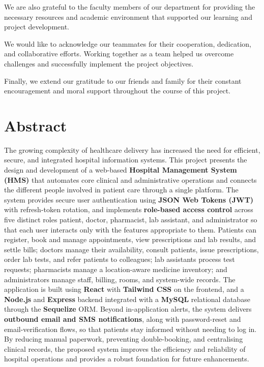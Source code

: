 \documentclass[12pt,a4paper]{report}
\begin{document}
We are also grateful to the faculty members of our department for providing the
necessary resources and academic environment that supported our learning and
project development.

We would like to acknowledge our teammates for their cooperation, dedication, and
collaborative efforts. Working together as a team helped us overcome challenges and
successfully implement the project objectives.

Finally, we extend our gratitude to our friends and family for their constant
encouragement and moral support throughout the course of this project.

\chapter*{Abstract}
The growing complexity of healthcare delivery has increased the need for efficient,
secure, and integrated hospital information systems. This project presents the design
and development of a web-based \textbf{Hospital Management System (HMS)} that
automates core clinical and administrative operations and connects the different
people involved in patient care through a single platform. The system provides secure
user authentication using \textbf{JSON Web Tokens (JWT)} with refresh-token rotation,
and implements \textbf{role-based access control} across five distinct roles patient,
doctor, pharmacist, lab assistant, and administrator so that each user interacts only
with the features appropriate to them. Patients can register, book and manage
appointments, view prescriptions and lab results, and settle bills; doctors manage
their availability, consult patients, issue prescriptions, order lab tests, and refer
patients to colleagues; lab assistants process test requests; pharmacists manage a
location-aware medicine inventory; and administrators manage staff, billing, rooms,
and system-wide records. The application is built using \textbf{React} with
\textbf{Tailwind CSS} on the frontend, and a \textbf{Node.js} and \textbf{Express}
backend integrated with a \textbf{MySQL} relational database through the
\textbf{Sequelize} ORM. Beyond in-application alerts, the system delivers
\textbf{outbound email and SMS notifications}, along with password-reset and
email-verification flows, so that patients stay informed without needing to log in. By
reducing manual paperwork, preventing double-booking, and centralising clinical
records, the proposed system improves the efficiency and reliability of hospital
operations and provides a robust foundation for future enhancements.
\end{document}
